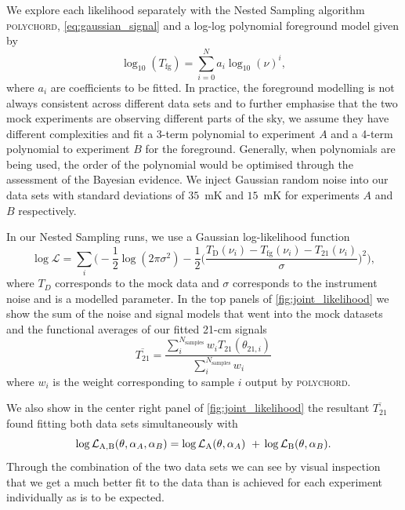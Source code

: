 We explore each likelihood separately with the Nested Sampling algorithm \textsc{polychord}, \cref{eq:gaussian_signal} and a log-log polynomial foreground model given by
\begin{equation}
    \log_{10}(T_\mathrm{fg}) = \sum^{N}_{i=0} a_i \log_{10}(\nu)^{i},
\end{equation}
where $a_i$ are coefficients to be fitted. In practice, the foreground modelling is not always consistent across different data sets and to further emphasise that the two mock experiments are observing different parts of the sky, we assume they have different complexities and fit a 3-term polynomial to experiment $A$ and a 4-term polynomial to experiment $B$ for the foreground. Generally, when polynomials are being used, the order of the polynomial would be optimised through the assessment of the Bayesian evidence. We inject Gaussian random noise into our data sets with standard deviations of $35$~mK and $15$~mK for experiments $A$ and $B$ respectively.

In our Nested Sampling runs, we use a Gaussian log-likelihood function
\begin{equation}
    \log\mathcal{L} = \sum_i \bigg(-\frac{1}{2}\log(2\pi \sigma^2) -\frac{1}{2}\bigg(\frac{T_\mathrm{D}(\nu_i) - T_\mathrm{fg}(\nu_i) - T_{21}(\nu_i)}{\sigma}\bigg)^2\bigg),
\end{equation}
where $T_D$ corresponds to the mock data and $\sigma$ corresponds to the instrument noise and is a modelled parameter. In the top panels of \cref{fig:joint_likelihood} we show the sum of the noise and signal models that went into the mock datasets and the functional averages of our fitted 21-cm signals
\begin{equation}
    \overline{T_{21}} = \frac{\sum_i^{N_\mathrm{samples}} w_i T_{21}(\theta_{21, i})}{\sum_i^{N_\mathrm{samples}} w_i}
\end{equation}
where $w_i$ is the weight corresponding to sample $i$ output by \textsc{polychord}.

We also show in the center right panel of \cref{fig:joint_likelihood} the resultant $\overline{T_{21}}$ found fitting both data sets simultaneously with
\begin{equation}
    \log \mathcal{L}_\mathrm{A,B} (\theta, \alpha_{A}, \alpha_B) =  \log \mathcal{L}_\mathrm{A} (\theta, \alpha_A)~+ \\ \log \mathcal{L}_\mathrm{B} (\theta, \alpha_B).
\end{equation}
Through the combination of the two data sets we can see by visual inspection that we get a much better fit to the data than is achieved for each experiment individually as is to be expected.

